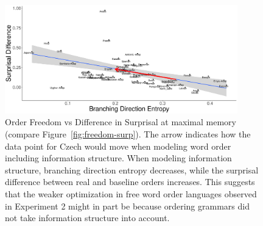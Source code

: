 \begin{figure}
\includegraphics[width=0.9\textwidth]{figures/surprisal-branching-entropy-REAL-infostruc-invert.pdf}
	\caption{Order Freedom vs Difference in Surprisal at maximal memory (compare Figure~\ref{fig:freedom-surp}). The arrow indicates how the data point for Czech would move when modeling word order including information structure.
	When modeling information structure, branching direction entropy decreases, while the surprisal difference between real and baseline orders increases.
	This suggests that the weaker optimization in free word order languages observed in Experiment 2 might in part be because ordering grammars did not take information structure into account.
	}\label{fig:freedom-mi-with-infostruc}
\end{figure}




%
%
%
%



